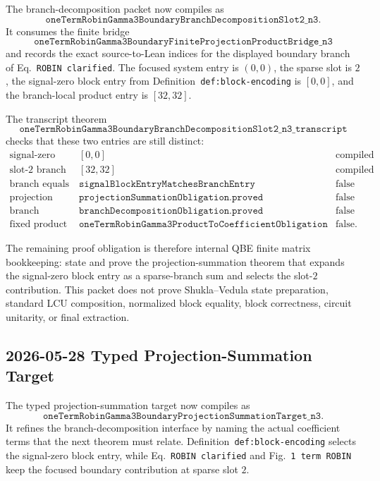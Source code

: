 The branch-decomposition packet now compiles as
\[
  \texttt{oneTermRobinGamma3BoundaryBranchDecompositionSlot2\_n3}.
\]
It consumes the finite bridge
\[
  \texttt{oneTermRobinGamma3BoundaryFiniteProjectionProductBridge\_n3}
\]
and records the exact source-to-Lean indices for the displayed boundary branch
of Eq.~\texttt{ROBIN clarified}.  The focused system entry is \((0,0)\), the
sparse slot is \(2\), the signal-zero block entry from
Definition~\texttt{def:block-encoding} is \([0,0]\), and the branch-local
product entry is \([32,32]\).

The transcript theorem
\[
  \texttt{oneTermRobinGamma3BoundaryBranchDecompositionSlot2\_n3\_transcript}
\]
checks that these two entries are still distinct:
\[
\begin{array}{lll}
\text{signal-zero block entry} & [0,0] & \text{compiled}\\
\text{slot-2 branch entry} & [32,32] & \text{compiled}\\
\text{branch equals block entry} & \texttt{signalBlockEntryMatchesBranchEntry} & \text{false}\\
\text{projection summation} & \texttt{projectionSummationObligation.proved} & \text{false}\\
\text{branch decomposition} & \texttt{branchDecompositionObligation.proved} & \text{false}\\
\text{fixed product theorem} & \texttt{oneTermRobinGamma3ProductToCoefficientObligation\ 3\ 0\ 0} & \text{false}.
\end{array}
\]

The remaining proof obligation is therefore internal QBE finite matrix
bookkeeping: state and prove the projection-summation theorem that expands the
signal-zero block entry as a sparse-branch sum and selects the slot-\(2\)
contribution.  This packet does not prove Shukla--Vedula state preparation,
standard LCU composition, normalized block equality, block correctness,
circuit unitarity, or final extraction.

\subsection{2026-05-28 Typed Projection-Summation Target}

The typed projection-summation target now compiles as
\[
  \texttt{oneTermRobinGamma3BoundaryProjectionSummationTarget\_n3}.
\]
It refines the branch-decomposition interface by naming the actual coefficient
terms that the next theorem must relate.  Definition~\texttt{def:block-encoding}
selects the signal-zero block entry, while Eq.~\texttt{ROBIN clarified} and
Fig.~\texttt{1 term ROBIN} keep the focused boundary contribution at sparse
slot \(2\).

